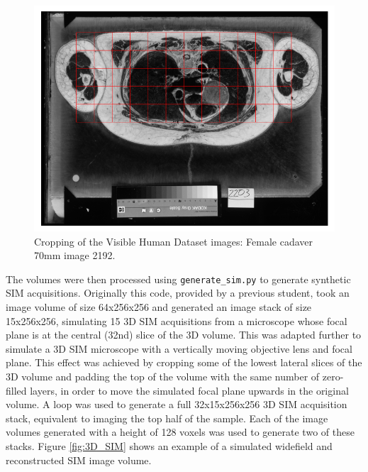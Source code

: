 \documentclass[12pt]{article}
\begin{document}
\begin{figure}[btp]
    \includegraphics[scale=0.65, center]{figures/visible_human_volumes_grey.png}
    \caption{Cropping of the Visible Human Dataset images: Female cadaver 70mm image 2192.}
    \label{fig:vhcrop}
\end{figure}

The volumes were then processed using \texttt{generate\_sim.py} to generate synthetic SIM acquisitions.
Originally this code, provided by a previous student, took an image volume of size 64x256x256 and generated an image stack of size 15x256x256,
simulating 15 3D SIM acquisitions from a microscope whose focal plane is at the central (32nd) slice of the 3D volume.
This was adapted further to simulate a 3D SIM microscope with a vertically moving objective lens and focal plane.
This effect was achieved by cropping some of the lowest lateral slices of the 3D volume and padding the top of the volume with the same number of zero-filled layers,
in order to move the simulated focal plane upwards in the original volume.
A loop was used to generate a full 32x15x256x256 3D SIM acquisition stack,
equivalent to imaging the top half of the sample.
Each of the image volumes generated with a height of 128 voxels was used to generate two of these stacks.
Figure \ref{fig:3D_SIM} shows an example of a simulated widefield and reconstructed SIM image volume.
\end{document}
